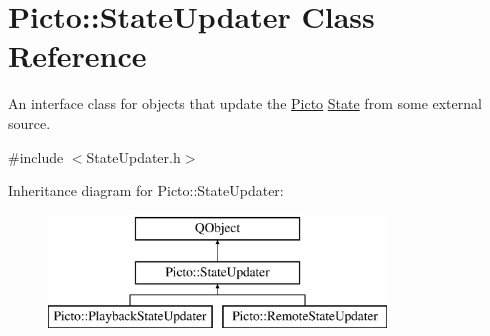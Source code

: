 \hypertarget{class_picto_1_1_state_updater}{\section{Picto\-:\-:State\-Updater Class Reference}
\label{class_picto_1_1_state_updater}
}


An interface class for objects that update the \hyperlink{namespace_picto}{Picto} \hyperlink{class_picto_1_1_state}{State} from some external source.  




{\ttfamily \#include $<$State\-Updater.\-h$>$}

Inheritance diagram for Picto\-:\-:State\-Updater\-:\begin{figure}[H]
\begin{center}
\leavevmode
\includegraphics[height=3.000000cm]{class_picto_1_1_state_updater}
\end{center}
\end{figure}
